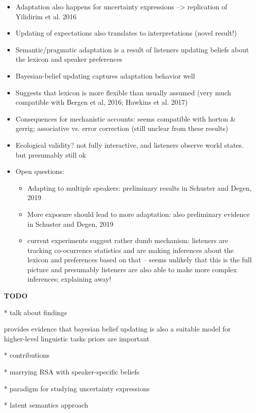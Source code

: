 \documentclass[lucida,biblatex]{sp} %
\begin{document}
\begin{itemize}
\item Adaptation also happens for uncertainty expressions --> replication of Yilidirim et al. 2016
\item Updating of expectations also translates to interpretations (novel result!)
\item Semantic/pragmatic adaptation is a result of listeners updating beliefs about the lexicon and speaker preferences
\item Bayesian-belief updating captures adaptation behavior well
\item Suggests that lexicon is more flexible than usually assumed (very much compatible with Bergen et al, 2016; Hawkins et al. 2017)
\item Consequences for mechanistic accounts: seems compatible with horton \& gerrig; associative vs. error correction (still unclear from these results)
\item Ecological validity? not fully interactive, and listeners observe world states. but presumably still ok
\item Open questions:
\begin{itemize}
\item Adapting to multiple speakers: preliminary results in Schuster and Degen, 2019
\item More exposure should lead to more adaptation: also preliminary evidence in Schuster and Degen, 2019
\item current experiments suggest rather dumb mechanism: listeners are tracking co-ocurrence statistics and 
are making inferences about the lexicon and preferences based on that -- seems unlikely that this is the full picture and
presumably listeners are also able to make more complex inferences; explaining away!
\end{itemize}
\end{itemize}


{\bf TODO} 

* talk about findings

provides evidence that bayesian belief updating is also a suitable model for higher-level linguistic tasks
priors are important




* contributions
	
	* marrying RSA with speaker-specific beliefs
	
	 * paradigm for studying uncertainty expressions
	
	 * latent semantics approach
\end{document}
